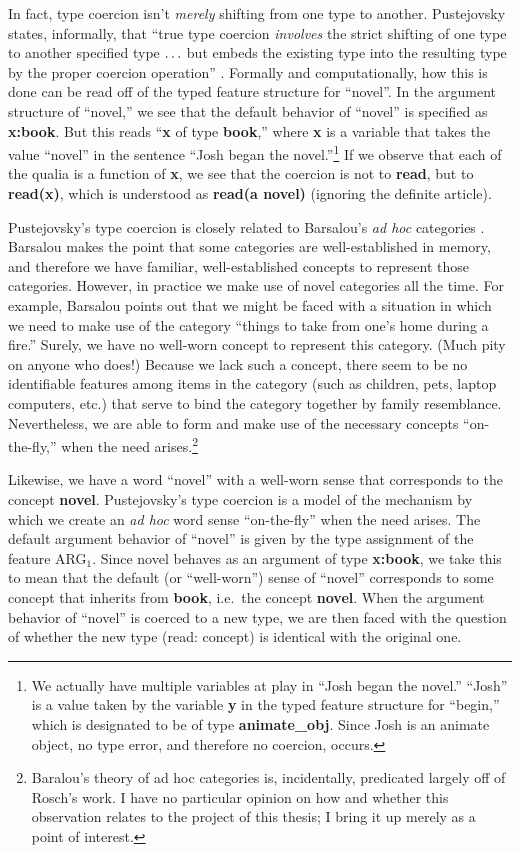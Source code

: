 In fact, type coercion isn't \emph{merely} shifting from one type to another. Pustejovsky states, informally, that ``true type coercion \emph{involves} the strict shifting of one type to another specified type $\mathellipsis$ but embeds the existing type into the resulting type by the proper coercion operation'' \cite[p.\ 115]{pustejovsky_generative_1998}. Formally and computationally, how this is done can be read off of the typed feature structure for ``novel''. In the argument structure of ``novel,'' we see that the default behavior of ``novel'' is specified as {\bf x:book}. But this reads ``{\bf x} of type {\bf book},'' where {\bf x} is a variable that takes the value ``novel'' in the sentence ``Josh began the novel.''\footnote{We actually have multiple variables at play in ``Josh began the novel.'' ``Josh'' is a value taken by the variable {\bf y} in the typed feature structure for ``begin,'' which is designated to be of type {\bf animate\_obj}. Since Josh is an animate object, no type error, and therefore no coercion, occurs.}  If we observe that each of the qualia is a function of {\bf x}, we see that the coercion is not to {\bf read}, but to {\bf read(x)}, which is understood as {\bf read(a novel)} (ignoring the definite article).

Pustejovsky's type coercion is closely related to Barsalou's \emph{ad hoc} categories \cite{barsalou_adhoc_1983}. Barsalou makes the point that some categories are well-established in memory, and therefore we have familiar, well-established concepts to represent those categories. However, in practice we make use of novel categories all the time. For example, Barsalou points out that we might be faced with a situation in which we need to make use of the category ``things to take from one's home during a fire.'' Surely, we have no well-worn concept to represent this category. (Much pity on anyone who does!) Because we lack such a concept, there seem to be no identifiable features among items in the category (such as children, pets, laptop computers, etc.) that serve to bind the category together by family resemblance. Nevertheless, we are able to form and make use of the necessary concepts ``on-the-fly,'' when the need arises.\footnote{Baralou's theory of ad hoc categories is, incidentally, predicated largely off of Rosch's work. I have no particular opinion on how and whether this observation relates to the project of this thesis; I bring it up merely as a point of interest.}

Likewise, we have a word ``novel'' with a well-worn sense that corresponds to the concept {\bf novel}. Pustejovsky's type coercion is a model of the mechanism by which we create an \emph{ad hoc} word sense ``on-the-fly'' when the need arises. The default argument behavior of ``novel'' is given by the type assignment of the feature ARG$_1$. Since novel behaves as an argument of type {\bf x:book}, we take this to mean that the default (or ``well-worn'') sense of ``novel'' corresponds to some concept that inherits from {\bf book}, i.e.\ the concept {\bf novel}. When the argument behavior of ``novel'' is coerced to a new type, we are then faced with the question of whether the new type (read: concept) is identical with the original one.

